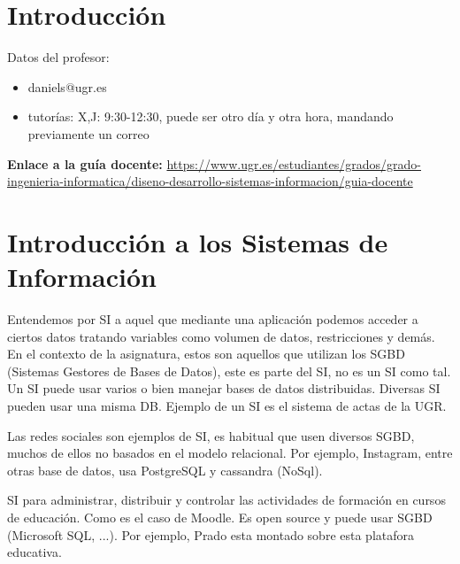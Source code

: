 \documentclass[12pt]{report} %
\providecommand{\tightlist}{%
  \setlength{\itemsep}{0pt}\setlength{\parskip}{0pt}}
\begin{document}
\hypertarget{introducciuxf3n}{%
\chapter{Introducción}\label{introducciuxf3n}}

Datos del profesor:

\begin{itemize}
\tightlist
\item
  daniels@ugr.es\\
\item
  tutorías: X,J: 9:30-12:30, puede ser otro día y otra hora, mandando
  previamente un correo
\end{itemize}

\begin{center}
\textbf{Enlace a la guía docente:} \href{https://www.ugr.es/estudiantes/grados/grado-ingenieria-informatica/diseno-desarrollo-sistemas-informacion/guia-docente}{https://www.ugr.es/estudiantes/grados/grado-ingenieria-informatica/diseno-desarrollo-sistemas-informacion/guia-docente}
\end{center}

\hypertarget{introducciuxf3n-a-los-sistemas-de-informaciuxf3n}{%
\chapter{Introducción a los Sistemas de
Información}\label{introducciuxf3n-a-los-sistemas-de-informaciuxf3n}}

\begin{definicion}
Entendemos por SI a aquel que mediante una aplicación podemos acceder a ciertos datos tratando variables como volumen de datos, restricciones y demás. En el contexto de la asignatura, estos son aquellos que utilizan los SGBD (Sistemas Gestores de Bases de Datos), este es parte del SI, no es un SI como tal. Un SI puede usar varios o bien manejar bases de datos distribuidas. Diversas SI pueden usar una misma DB. Ejemplo de un SI es el sistema de actas de la UGR.
\end{definicion}

Las redes sociales son ejemplos de SI, es habitual que usen diversos
SGBD, muchos de ellos no basados en el modelo relacional. Por ejemplo,
Instagram, entre otras base de datos, usa PostgreSQL y cassandra
(NoSql).

\begin{definicion}
SI para administrar, distribuir y controlar las actividades de formación en cursos de educación. Como es el caso de Moodle. Es open source y puede usar SGBD (Microsoft SQL, ...). Por ejemplo, Prado esta montado sobre esta platafora educativa.
\end{definicion}
\end{document}
